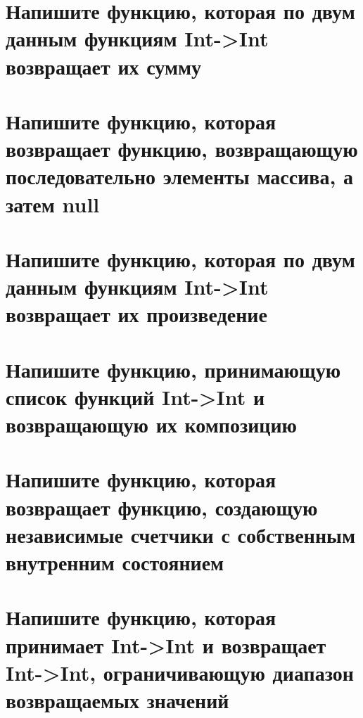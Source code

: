 \documentclass[12pt]{article}
\begin{document}
\section*{Напишите функцию, которая по двум данным функциям Int->Int возвращает их сумму}
\begin{enumerate}[leftmargin=*]
\end{enumerate}
\vspace{2mm}
\section*{Напишите функцию, которая возвращает функцию, возвращающую последовательно элементы массива, а затем null}
\begin{enumerate}[leftmargin=*]
\end{enumerate}
\vspace{2mm}
\section*{Напишите функцию, которая по двум данным функциям Int->Int возвращает их произведение}
\begin{enumerate}[leftmargin=*]
\end{enumerate}
\vspace{2mm}
\section*{Напишите функцию, принимающую список функций Int->Int и возвращающую их композицию}
\begin{enumerate}[leftmargin=*]
\end{enumerate}
\vspace{2mm}
\section*{Напишите функцию, которая возвращает функцию, создающую независимые счетчики с собственным внутренним состоянием}
\begin{enumerate}[leftmargin=*]
\end{enumerate}
\vspace{2mm}
\section*{Напишите функцию, которая принимает Int->Int и возвращает Int->Int, ограничивающую диапазон возвращаемых значений}
\begin{enumerate}[leftmargin=*]
\end{enumerate}
\vspace{2mm}
\end{document}
